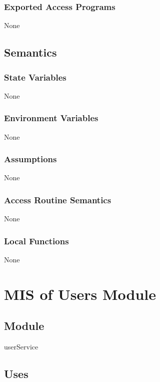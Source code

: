 \documentclass[12pt, titlepage]{article}
\begin{document}
\subsubsection{Exported Access Programs}

None
\subsection{Semantics}

\subsubsection{State Variables}

None

\subsubsection{Environment Variables}

None

\subsubsection{Assumptions}

None

\subsubsection{Access Routine Semantics}

None

\subsubsection{Local Functions}

None

\newpage

\section{MIS of Users Module} \label{mUsers}
\subsection{Module}

userService

\subsection{Uses}
\end{document}

